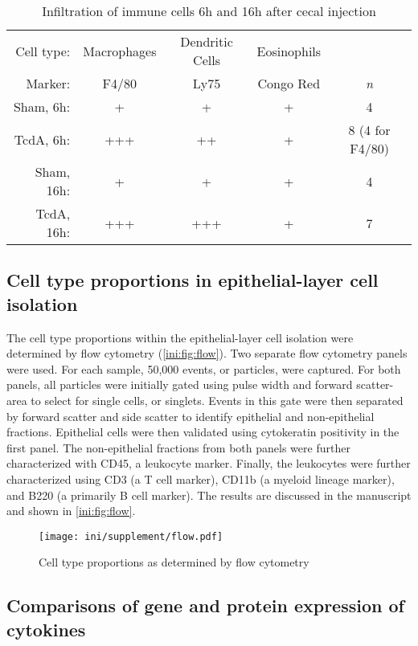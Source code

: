 \begin{table}[ht]
\centering
\begin{tabular}{ r c c c c }
  Cell type: & Macrophages & Dendritic Cells & Eosinophils &  \\
  Marker: & F4/80 & Ly75 & Congo Red & \emph{n}\\ \hline
  Sham, 6h: & + & + & + & 4 \\
  TcdA, 6h: & +++ & ++ & + & 8 (4 for F4/80) \\
  Sham, 16h: & + & + & + & 4 \\
  TcdA, 16h: & +++ & +++ & + & 7 \\
\end{tabular}
\caption{Infiltration of immune cells 6h and 16h after cecal injection}
\label{ini:tab:ihc}
\end{table}

\subsection{Cell type proportions in epithelial-layer cell isolation}

The cell type proportions within the epithelial-layer cell isolation
were determined by flow cytometry (\autoref{ini:fig:flow}). Two
separate flow cytometry panels were used. For each sample, 50,000
events, or particles, were captured. 
For both panels, all particles were initially gated using pulse 
width and forward scatter-area to select for single 
cells, or singlets.  Events in this gate were then separated 
by forward scatter and side scatter to identify epithelial 
and non-epithelial fractions.  Epithelial cells were then 
validated using cytokeratin positivity in the first panel.  
The non-epithelial fractions from both panels were further characterized
with CD45, a leukocyte marker. Finally, the leukocytes were further characterized
using CD3 (a T cell marker), CD11b (a myeloid lineage marker), and 
B220 (a primarily B cell marker). The results are discussed in the manuscript
and shown in \autoref{ini:fig:flow}.

\begin{figure}[h!]
  \centering
    \texttt{[image: ini/supplement/flow.pdf]}
  \caption{Cell type proportions as determined by flow cytometry}
  \label{ini:fig:flow}
\end{figure}

\subsection{Comparisons of gene and protein expression of cytokines}

